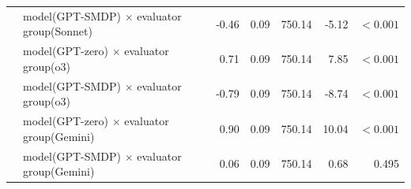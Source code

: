 \documentclass{wiley-article}
\begin{document}
{\begin{longtable}{@{}l p{} rrrrr@{}}
    & model(GPT-SMDP) $\times$ evaluator group(Sonnet)        &-0.46 & 0.09 & 750.14 &  -5.12 & $<\!0.001$ \\
    & model(GPT-zero) $\times$ evaluator group(o3)            & 0.71 & 0.09 & 750.14 &   7.85 & $<\!0.001$ \\
    & model(GPT-SMDP) $\times$ evaluator group(o3)            &-0.79 & 0.09 & 750.14 &  -8.74 & $<\!0.001$ \\
    & model(GPT-zero) $\times$ evaluator group(Gemini)        & 0.90 & 0.09 & 750.14 &  10.04 & $<\!0.001$ \\
    & model(GPT-SMDP) $\times$ evaluator group(Gemini)        & 0.06 & 0.09 & 750.14 &   0.68 & 0.495 \\
\end{longtable}
} %
\end{document}
